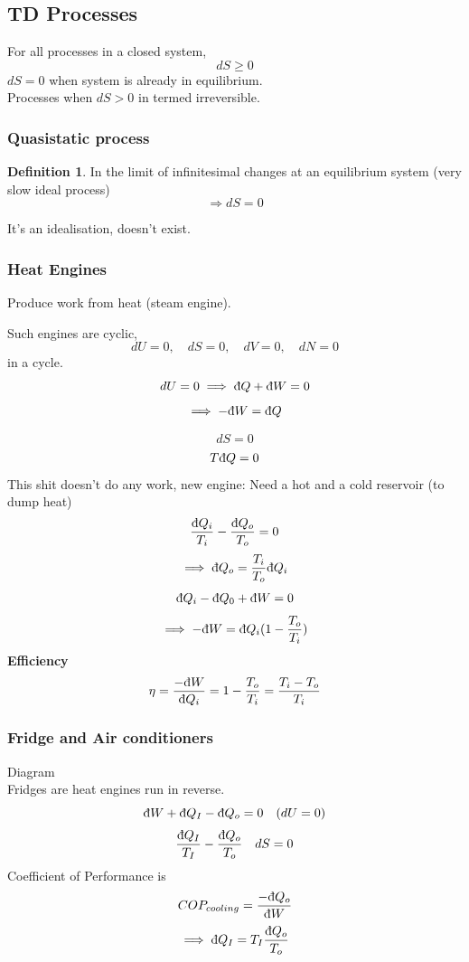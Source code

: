 \documentclass[11pt]{book}
\theoremstyle{definition}
\newtheorem{defn}{Definition}[section]
\begin{document}
\subsection{TD Processes}
For all processes in a closed system, \[ dS \geq 0 \] 
$dS = 0 $ when system is already in equilibrium. \\
Processes when $ dS > 0 $ in termed irreversible.
\subsubsection{Quasistatic process}%
\label{ssub:Quasistaticprocess}
\begin{defn}
	In the limit of infinitesimal changes at an equilibrium system (very slow ideal process)
	\[ \Rightarrow dS = 0 \] 
	
\end{defn}
It's an idealisation, doesn't exist.

\subsubsection{Heat Engines}%
\label{ssub:HeatEngines}
Produce work from heat (steam engine).

Such engines are cyclic, 
\[ dU = 0, \quad dS = 0, \quad  dV = 0, \quad dN = 0\] in a cycle.
\[ dU = 0 \implies \text{\dj} Q + \text{\dj} W = 0 \] 
\[ \implies - \text{\dj} W = \text{\dj} Q \] 

\[ dS = 0 \] 
\[ T \text{\dj} Q = 0 \] 
This shit doesn't do any work, new engine:
Need a hot and a cold reservoir (to dump heat)
\[ \frac{\text{\dj} Q_i}{T_i} - \frac{ \text{\dj} Q_o}{T_o} = 0 \] 
\[ \implies \text{\dj} Q_o = \frac{T_i}{T_o} \text{\dj} Q_i \] 
\[ \text{\dj} Q_i - \text{\dj} Q_0 +\text{\dj} W  = 0\] 
\[ \implies -\text{\dj} W = \text{\dj} Q_i (1-\frac{T_o}{T_i}) \] 
\textbf{Efficiency} 
\[ \eta = \frac{-\text{\dj} W}{\text{\dj} Q_i} = 1 - \frac{T_o}{T_i} = \frac{T_i - T_o}{T_i} \] 

\subsubsection{Fridge and Air conditioners}%
\label{ssub:Fridge and Air conditioners}

Diagram\\
Fridges are heat engines run in reverse.
\[ \text{\dj}W + \text{\dj}Q_I - \text{\dj}Q_o = 0 \quad (dU = 0)\] 
\[ \frac{ \text{\dj} Q_I }{T_I} - \frac{ \text{\dj}Q_o }{T_o} \quad dS=0 \] 
Coefficient of Performance is 
\[ COP_{cooling} = \frac{- \text{\dj}Q_o}{ \text{\dj}W }\] 
\[ \implies \text{\dj}Q_I = T_I \frac{ \text{\dj}Q_o }{T_o} \] 
\end{document}
